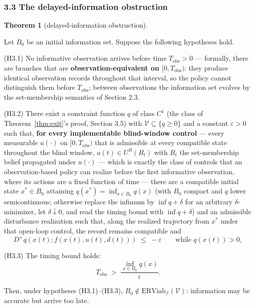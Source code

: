 \documentclass[10pt,twocolumn]{article}
\theoremstyle{definition}
\newtheorem{theorem}{Theorem}
\begin{document}
\subsubsection{3.3 The delayed-information
obstruction}\label{the-delayed-information-obstruction}

\begin{theorem}[delayed-information obstruction]\label{thm:delayed}

Let \(B_0\) be an initial information set. Suppose the following
hypotheses hold.

(H3.1) No informative observation arrives before time
\(T_{\mathrm{obs}} > 0\) --- formally, there are branches that are
\textbf{observation-equivalent on \([0, T_{\mathrm{obs}})\)}: they
produce identical observation records throughout that interval, so the
policy cannot distinguish them before \(T_{\mathrm{obs}}\); between
observations the information set evolves by the set-membership semantics
of Section 2.3.

(H3.2) There exist a constraint function \(q\) of class \(C^1\) (the class of Theorem~\ref{thm:exit}'s proof, Section 3.5) with \(\mathcal{V} \subseteq \{ q \ge 0 \}\)
and a constant \(\varepsilon > 0\) such that, \textbf{for every implementable blind-window control} --- every
measurable \(u(\cdot)\) on \([0, T_{\mathrm{obs}})\) that is admissible at
every compatible state throughout the blind window, \(u(t) \in U^B(B_t)\)
with \(B_t\) the set-membership belief propagated under \(u(\cdot)\) ---
which is exactly the class of controls that an observation-based policy
can realize before the first informative observation, where its actions
are a fixed function of time --- there are a compatible initial state \(x^* \in B_0\) attaining
\(q(x^*) = \inf_{x \in B_0} q(x)\) (with \(B_0\) compact and \(q\) lower
semicontinuous; otherwise replace the infimum by \(\inf q + \delta\) for
an arbitrary \(\delta\)-minimizer, let \(\delta \downarrow 0\), and read
the timing bound with \(\inf q + \delta\)) and an admissible disturbance
realization such that, along the realized trajectory from \(x^*\) under
that open-loop control, the record remains compatible and
\[D^+ q(x(t); f(x(t), u(t), d(t))) \;\le\; -\varepsilon \qquad \text{while } q(x(t)) > 0, \tag{2}\]

(H3.3) The timing bound holds:
\[T_{\mathrm{obs}} \;>\; \frac{\inf_{x \in B_0} q(x)}{\varepsilon}. \tag{3}\]

Then, under hypotheses (H3.1)--(H3.3),
\(B_0 \notin \mathrm{ERViab}_{\mathcal{I}}(\mathcal{V})\): information
may be accurate but arrive too late.

\end{theorem}
\end{document}
